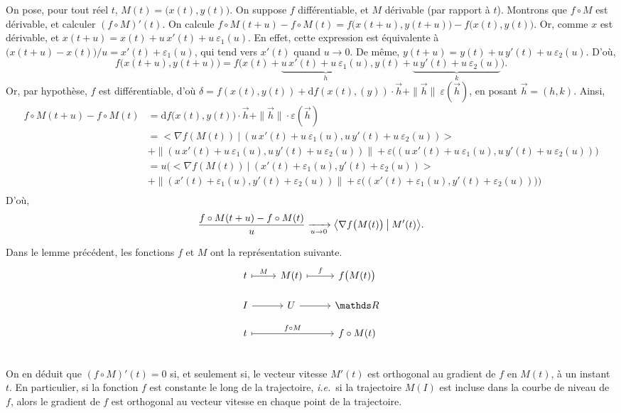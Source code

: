 \begin{prv}
	On pose, pour tout réel $t$, $M(t) = \big(x(t), y(t)\big)$.
	On suppose $f$ différentiable, et $M$ dérivable (par rapport à $t$).
	Montrons que $f\circ M$ est dérivable, et calculer $(f\circ M)'(t)$.
	On calcule $f\circ M(t + u) - f\circ M(t) = f\big(x(t+u), y(t+u)\big) - f\big(x(t), y(t)\big)$.
	Or, comme $x$ est dérivable, et $x(t+ u) = x(t) + u\, x'(t) + u\:\varepsilon_1(u)$. En effet, cette expression est équivalente à $\big(x(t+u) - x(t)\big) / u = x'(t) + \varepsilon_1(u)$, qui tend vers $x'(t)$ quand $u \to 0$.
	De même, $y(t + u) = y(t) + u\,y'(t) + u\:\varepsilon_2(u)$.
	D'où, \[
		f\big(x(t+u), y(t+u)\big) = f\big(x(t) + \underbrace{u\,x'(t) + u\:\varepsilon_1(u)}_{h}, y(t) + \underbrace{u\,y'(t) + u\:\varepsilon_2(u)}_{k}\big).
	\]
	Or, par hypothèse, $f$ est différentiable, d'où $\delta = f(x(t),y(t)) + \mathrm{d}f(x(t),(y))\cdot \vec{h} + \|\vec{h}\|\: \varepsilon(\vec{h})$, en posant $\vec{h} = (h, k)$.
	Ainsi,
	\begin{align*}
		f \circ M(t + u) - f \circ M(t) &= \mathrm{d}f\big(x(t), y(t)\big) \cdot \vec{h} + \|\vec{h}\| \cdot \varepsilon(\vec{h})\\
		&= \big<\nabla f(M(t))\:\big|\: (u\,x'(t) + u\:\varepsilon_1(u), u\,y'(t) + u\:\varepsilon_2(u)) \big>\\
		&+ \|(u\,x'(t) + u\:\varepsilon_1(u), u\,y'(t) + u\:\varepsilon_2(u))\| + \varepsilon\big((u\,x'(t) + u\:\varepsilon_1(u), u\,y'(t) + u\:\varepsilon_2(u))\big) \\
		&= u\Big(\big<\nabla f(M(t))\:\big|\: (x'(t) + \varepsilon_1(u), y'(t) + \varepsilon_2(u)) \big>\\
		&+ \|(x'(t) + \varepsilon_1(u), y'(t) + \varepsilon_2(u))\| + \varepsilon\big((x'(t) + \varepsilon_1(u), y'(t) + \varepsilon_2(u))\big)\Big) \\
	\end{align*}
	D'où, \[
		\frac{f \circ M(t + u) - f\circ M(t)}{u} \xrightarrow[u \to 0]{} \big<\nabla f\big(M(t)\big) \:\big|\: M'(t) \big>
	.\] 
\end{prv}

Dans le lemme précédent, les fonctions $f$ et $M$ ont la représentation suivante.
\[
	\begin{tikzcd}
		t \ar[r, mapsto, "M"] & M(t) \ar[r, mapsto, "f"] & f\big(M(t)\big)\\[-2mm]
		I \ar[r] & U \ar[r] & \R\\[-2mm]
		t \ar[rr, mapsto, "f \circ M"] && f  \circ M(t)\\
	\end{tikzcd}
\]
On en déduit que $(f  \circ M)'(t) = 0$ si, et seulement si, le vecteur vitesse $M'(t)$ est orthogonal au gradient de $f$ en $M(t)$, à un instant $t$.
En particulier, si la fonction $f$ est constante le long de la trajectoire, \textit{i.e.}\ si la trajectoire $M(I)$ est incluse dans la courbe de niveau de $f$, alors le gradient de $f$ est orthogonal au vecteur vitesse en chaque point de la trajectoire.


